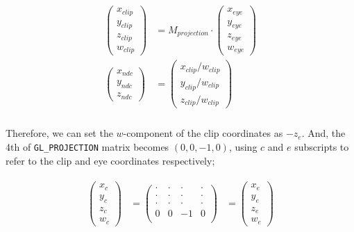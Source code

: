 \begin{equation}
\begin{aligned}
\begin{split}
\begin{pmatrix} x_{clip}\\y_{clip}\\z_{clip}\\w_{clip} \end{pmatrix} &= 
M_{projection} \cdot \begin{pmatrix} x_{eye}\\y_{eye}\\z_{eye}\\w_{eye} \end{pmatrix}\\
\begin{pmatrix} x_{ndc}\\y_{ndc}\\z_{ndc}\end{pmatrix} &=
\begin{pmatrix} x_{clip}/w_{clip}\\y_{clip}/w_{clip}\\z_{clip}/w_{clip} \end{pmatrix}\\
\end{split}
\end{aligned}
\label{eq.clip}
\end{equation}

Therefore, we can set the $w$-component of the clip coordinates as $-z_e$. And, the 4th of \verb|GL_PROJECTION| matrix becomes $(0, 0, -1, 0)$, using $c$ and $e$ subscripts to refer to the clip and eye coordinates respectively; 

\begin{equation}
\begin{aligned}
\begin{split}
\begin{pmatrix} x_{c}\\y_{c}\\z_{c}\\w_{c} \end{pmatrix} &= 
\begin{pmatrix} 
\cdot & \cdot & \cdot & \cdot \\
\cdot & \cdot & \cdot & \cdot \\
\cdot & \cdot & \cdot & \cdot \\
0 & 0 & -1 & 0 \\
\end{pmatrix} &=
\begin{pmatrix} x_{e}\\y_{e}\\z_{e}\\w_{e} \end{pmatrix}
\end{split}
\end{aligned}
\label{eq.rows}
\end{equation}

